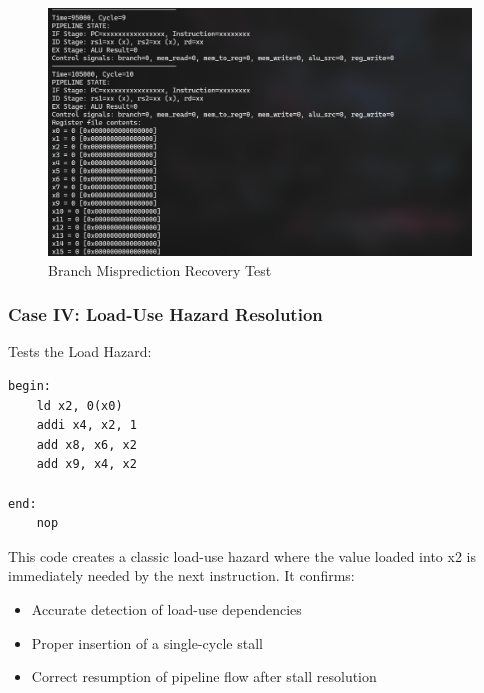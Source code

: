 \documentclass{article}
\numberwithin{figure}{section}
\numberwithin{table}{section}
\begin{document}
\begin{figure}[H]
    \centering
    \includegraphics[width=0.95\linewidth]{pipe_test4.png}
    \caption{Branch Misprediction Recovery Test}
    \label{fig:pipe-test4}
\end{figure}

\subsubsection{Case IV: Load-Use Hazard Resolution}

Tests the Load Hazard:

\begin{lstlisting}[style=verilog-style]
begin:
    ld x2, 0(x0)
    addi x4, x2, 1
    add x8, x6, x2
    add x9, x4, x2

end:
    nop
\end{lstlisting}

This code creates a classic load-use hazard where the value loaded into x2 is immediately needed by the next instruction. It confirms:
\begin{itemize}
    \item Accurate detection of load-use dependencies
    \item Proper insertion of a single-cycle stall
    \item Correct resumption of pipeline flow after stall resolution
\end{itemize}
\end{document}
